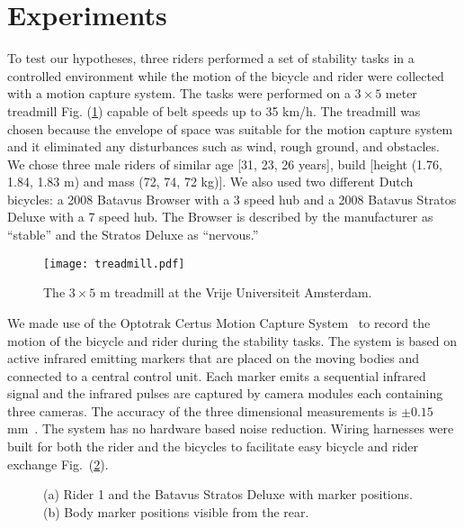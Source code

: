 \documentclass[smallextended]{svjour3}     %
\begin{document}
\section{Experiments}
\label{sec:exp}
To test our hypotheses, three riders performed a set of stability tasks in a
controlled environment while the motion of the bicycle and rider were collected
with a motion capture system. The tasks were performed on a $3\times5$ meter
treadmill Fig. (\ref{fig:treadmill}) capable of belt speeds up to 35 km/h. The
treadmill was chosen because the envelope of space was suitable for the motion
capture system and it eliminated any disturbances such as wind, rough ground,
and obstacles.  We chose three male riders of similar age [31, 23, 26 years],
build [height (1.76, 1.84, 1.83 m) and mass (72, 74, 72 kg)]. We also used two
different Dutch bicycles: a 2008 Batavus
Browser with a 3 speed hub and a 2008 Batavus Stratos Deluxe with a 7 speed
hub. The Browser is described by the manufacturer as ``stable'' and the Stratos
Deluxe as ``nervous.''
\begin{figure}
    \centering
        \texttt{[image: treadmill.pdf]}
    \caption{The $3\times5$ m treadmill at the Vrije Universiteit Amsterdam.}
    \label{fig:treadmill}
\end{figure}

We made use of the Optotrak Certus Motion Capture
System~\cite{NorthernDigitalIncorporated2009} to record the motion of the
bicycle and rider during the stability tasks. The system is based on active
infrared emitting markers that are placed on the moving bodies and connected to
a central control unit. Each marker emits a sequential infrared signal and the
infrared pulses are captured by camera modules each
containing three cameras. The accuracy of the three dimensional measurements is
$\pm0.15$ mm~\cite{NorthernDigitalIncorporated2009}.
The system has no hardware based noise reduction. Wiring
harnesses were built for both the rider and the bicycles to facilitate easy
bicycle and rider exchange Fig.~(\ref{fig:markers}).
\begin{figure}
    \centering
    \caption{(a) Rider 1 and the Batavus Stratos Deluxe with marker positions. (b) Body marker positions visible from the rear.}
    \label{fig:markers}
\end{figure}
\end{document}
